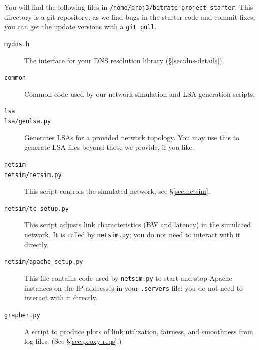\documentclass{article}
\begin{document}
You will find the following files in
\texttt{/home/proj3/bitrate-project-starter}. This directory is a git
repository; as we find bugs in the starter code and commit fixes, you can get
the update versions with a \texttt{git pull}.
\begin{description}
	\item[\texttt{mydns.h}] The interface for your DNS resolution library (\S\ref{sec:dns-details}).

	\item[\texttt{common}] Common code used by our network simulation and LSA generation scripts.

	\item[\texttt{lsa}]
	\item[\texttt{lsa/genlsa.py}] Generates LSAs for a provided network
	topology. You may use this to generate LSA files beyond those we provide,
	if you like.

	\item[\texttt{netsim}]
	\item[\texttt{netsim/netsim.py}] This script controls the simulated
	network; see \S\ref{sec:netsim}.
	\item[\texttt{netsim/tc\_setup.py}] This script adjusts link
	characteristics (BW and latency) in the simulated network. It is called by
	\texttt{netsim.py}; you do not need to interact with it directly.
	\item[\texttt{netsim/apache\_setup.py}] This file contains code used by
	\texttt{netsim.py} to start and stop Apache instances on the IP addresses
	in your \texttt{.servers} file; you do not need to interact with it
	directly.

	\item[\texttt{grapher.py}] A script to produce plots of link utilization, fairness, and smoothness from log files. (See \S\ref{sec:proxy-reqs}.)


\end{description}
\end{document}
